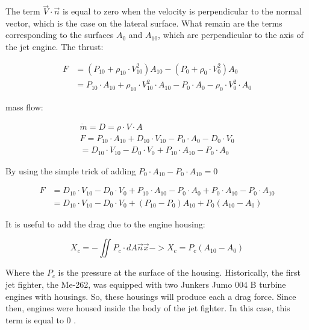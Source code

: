 \documentclass[10pt]{article}
\begin{document}
The term $\vec{V} \cdot \vec{n}$ is equal to zero when the velocity is perpendicular to the normal vector, which is the case on the lateral surface. What remain are the terms corresponding to the surfaces $A_{0}$ and $A_{10}$, which are perpendicular to the axis of the jet engine. The thrust:


\begin{align*}
F & =\left(P_{10}+\rho_{10} \cdot V_{10}^{2}\right) A_{10}-\left(P_{0}+\rho_{0} \cdot V_{0}^{2}\right) A_{0}  \tag{12}\\
& =P_{10} \cdot A_{10}+\rho_{10} \cdot V_{10}^{2} \cdot A_{10}-P_{0} \cdot A_{0}-\rho_{0} \cdot V_{0}^{2} \cdot A_{0}
\end{align*}


mass flow:


\begin{gather*}
\dot{m}=D=\rho \cdot V \cdot A  \tag{13}\\
F=P_{10} \cdot A_{10}+D_{10} \cdot V_{10}-P_{0} \cdot A_{0}-D_{0} \cdot V_{0}  \tag{14}\\
=D_{10} \cdot V_{10}-D_{0} \cdot V_{0}+P_{10} \cdot A_{10}-P_{0} \cdot A_{0}
\end{gather*}


By using the simple trick of adding $P_{0} \cdot A_{10}-P_{0} \cdot A_{10}=0$


\begin{align*}
F & =D_{10} \cdot V_{10}-D_{0} \cdot V_{0}+P_{10} \cdot A_{10}-P_{0} \cdot A_{0}+P_{0} \cdot A_{10}-P_{0} \cdot A_{10}  \tag{15}\\
& =D_{10} \cdot V_{10}-D_{0} \cdot V_{0}+\left(P_{10}-P_{0}\right) A_{10}+P_{0}\left(A_{10}-A_{0}\right)
\end{align*}


It is useful to add the drag due to the engine housing:


\begin{equation*}
X_{c}=-\iint P_{c} \cdot d A \vec{n} \vec{x}->X_{c}=P_{c}\left(A_{10}-A_{0}\right) \tag{16}
\end{equation*}


Where the $P_{c}$ is the pressure at the surface of the housing. Historically, the first jet fighter, the Me-262, was equipped with two Junkers Jumo 004 B turbine engines with housings. So, these housings will produce each a drag force. Since then, engines were housed inside the body of the jet fighter. In this case, this term is equal to 0 .
\end{document}
